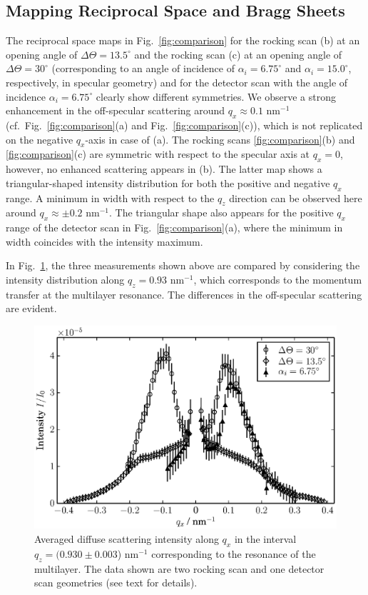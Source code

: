 \subsection{Mapping Reciprocal Space and Bragg Sheets}
The reciprocal space maps in Fig.~\ref{fig:comparison} for the rocking scan (b) at an opening angle of $\Delta \Theta = 13.5^\circ$ and the rocking scan (c) at an opening angle of $\Delta \Theta = 30^\circ$ (corresponding to an angle of incidence of $\alpha_i = 6.75^\circ$ and $\alpha_i = 15.0^\circ$, respectively, in specular geometry) and for the detector scan with the angle of incidence $\alpha_i = 6.75^\circ$ clearly show different symmetries. We observe a strong enhancement in the off-specular scattering around $q_x\approx0.1$ nm$^{-1}$ (cf.~Fig.~\ref{fig:comparison}(a) and Fig.~\ref{fig:comparison}(c)), which is not replicated on the negative $q_x$-axis in case of (a). The rocking scans \ref{fig:comparison}(b) and \ref{fig:comparison}(c) are symmetric with respect to the specular axis at $q_x=0$, however, no enhanced scattering appears in (b). The latter map shows a triangular-shaped intensity distribution for both the positive and 
negative $q_x$ range. A minimum in width with respect to the $q_z$ direction can be observed here around $q_x \approx \pm 0.2$ nm$^{-1}$. The triangular shape also appears for the 
positive $q_x$ range 
of the detector scan in Fig.~\ref{fig:comparison}(a), where the minimum in width coincides with the intensity maximum.


In Fig.~\ref{fig:BraggSheet_DetectorAndRocking}, the three measurements shown above are compared by considering the intensity distribution along $q_z=0.93$ nm$^{-1}$, which corresponds to the momentum transfer at the multilayer resonance. The differences in the off-specular scattering are evident. 
\begin{figure}[htbp]
	\includegraphics[width=0.7
	\textwidth]{images/BraggSheet_DetectorAndRocking} \caption{Averaged diffuse scattering intensity along $q_x$ in the interval  $q_z=(0.930 \pm 0.003$) nm$^{-1}$ corresponding to the resonance of the multilayer. The data shown are two rocking scan and one detector scan geometries (see text for details).} \label{fig:BraggSheet_DetectorAndRocking} 
\end{figure}

